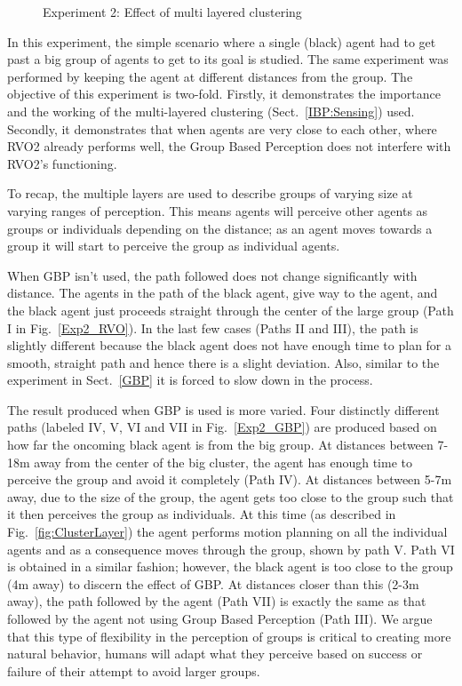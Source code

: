 \begin{figure}[!t]
  \centering
   \hspace{1pt}
  \caption{Experiment 2: Effect of multi layered clustering}
  \label{Exp2}
\end{figure}

In this experiment, the simple scenario where a single (black) agent had to get past a big group of agents to get to its goal is studied. The same experiment was performed by keeping the agent at different distances from the group. The objective of this experiment is two-fold. Firstly, it demonstrates the importance and the working of the multi-layered clustering (Sect.~\ref{IBP:Sensing}) used. Secondly, it demonstrates that when agents are very close to each other, where RVO2 already performs well, the Group Based Perception does not interfere with RVO2's functioning.

To recap, the multiple layers are used to describe groups of varying size at varying ranges of perception. This means agents will perceive other agents as groups or individuals depending on the distance; as an agent moves towards a group it will start to perceive the group as individual agents. 

When GBP isn't used, the path followed does not change significantly with distance. The agents in the path of the black agent, give way to the agent, and the black agent just proceeds straight through the center of the large group (Path I in Fig.~\ref{Exp2_RVO}). In the last few cases (Paths II and III), the path is slightly different because the black agent does not have enough time to plan for a smooth, straight path and hence there is a slight deviation. Also, similar to the experiment in Sect.~\ref{GBP} it is forced to slow down in the process.

The result produced when GBP is used is more varied. Four distinctly different paths (labeled IV, V, VI and VII in Fig.~\ref{Exp2_GBP}) are produced based on how far the oncoming black agent is from the big group. At distances between 7-18m away from the center of the big cluster, the agent has enough time to perceive the group and avoid it completely (Path IV). At distances between 5-7m away, due to the size of the group, the agent gets too close to the group such that it then perceives the group as individuals. At this time (as described in Fig.~\ref{fig:ClusterLayer}) the agent performs motion planning on all the individual agents and as a consequence moves through the group, shown by path V. Path VI is obtained in a similar fashion; however, the black agent is too close to the group (4m away) to discern the effect of GBP. At distances closer than this (2-3m away), the path followed by the agent (Path VII) is exactly the same as that followed by the agent not using Group Based Perception (Path III). We argue that this type of flexibility in the perception of groups is critical to creating more natural behavior, humans will adapt what they perceive based on success or failure of their attempt to avoid larger groups. 


